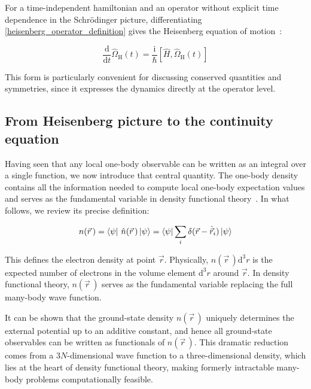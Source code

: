 For a time-independent hamiltonian and an operator without explicit time dependence in the Schrödinger picture, differentiating \eqref{heisenberg_operator_definition} gives the Heisenberg equation of motion~\cite{shankar2012principles}:

\begin{equation}
    \frac{\mathrm{d}}{\mathrm{d}t}\hat{\Omega}_\mathrm{H}(t)
    =\frac{\mathrm{i}}{\hbar}\left[\hat{H},\hat{\Omega}_\mathrm{H}(t)\right]
\label{heisenberg_equation_of_motion}
\end{equation}

This form is particularly convenient for discussing conserved quantities and symmetries, since it expresses the dynamics directly at the operator level.

\subsection{From Heisenberg picture to the continuity equation}

Having seen that any local one-body observable can be written as an integral over a single function,
we now introduce that central quantity.
The one-body density contains all the information needed to compute local one-body expectation values and serves as the fundamental variable in density functional theory~\cite{hohenberg1964inhomogeneous,jones2015density,maitra2016perspective}.
In what follows, we review its precise definition:

\begin{equation}
    n(\vec{r}\,)
    = \bra{\psi}\,\hat{n}(\vec{r}\,)\ket{\psi}
    = \bra{\psi}\sum_i\delta(\vec{r} - \hat{\vec{r}}_i)\ket{\psi}
\label{particle_density_operator_definition}
\end{equation}

This defines the electron density at point $\vec{r}$.
Physically, $n(\vec{r}\,)\mathrm{d}^3r$ is the expected number of electrons in the volume element $\mathrm{d}^3r$ around $\vec{r}$.
In density functional theory, $n(\vec{r}\,)$ serves as the fundamental variable replacing the full many-body wave function.  

It can be shown that the ground-state density $n(\vec{r}\,)$ uniquely determines the external potential up to an additive constant, and hence all ground-state observables can be written as functionals of $n(\vec{r}\,)$.
This dramatic reduction comes from a 3$N$-dimensional wave function to a three-dimensional density, which lies at the heart of density functional theory, making formerly intractable many-body problems computationally feasible.

